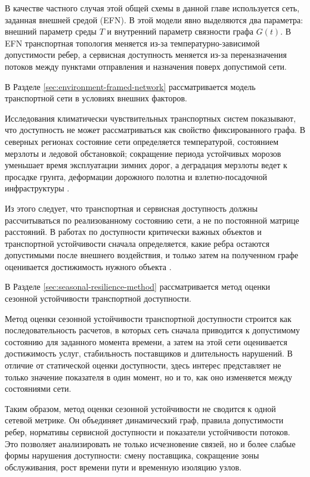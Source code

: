 В качестве частного случая этой общей схемы в данной главе используется сеть, заданная внешней средой (EFN). В этой модели явно выделяются два параметра: внешний параметр среды \(T\) и внутренний параметр связности графа \(G(t)\). В EFN транспортная топология меняется из-за температурно-зависимой допустимости ребер, а сервисная доступность меняется из-за переназначения потоков между пунктами отправления и назначения поверх допустимой сети.

В Разделе \ref{sec:environment-framed-network} рассматривается модель транспортной сети в условиях внешних факторов.

Исследования климатически чувствительных транспортных систем показывают, что доступность не может рассматриваться как свойство фиксированного графа. В северных регионах состояние сети определяется температурой, состоянием мерзлоты и ледовой обстановкой; сокращение периода устойчивых морозов уменьшает время эксплуатации зимних дорог, а деградация мерзлоты ведет к просадке грунта, деформации дорожного полотна и взлетно-посадочной инфраструктуры \cite{dong2025iceRoads,waite2023arcticTransport,stephenson2011arcticAccess,povoroznyuk2022arcticRoads}.

Из этого следует, что транспортная и сервисная доступность должны рассчитываться по реализованному состоянию сети, а не по постоянной матрице расстояний. В работах по доступности критически важных объектов и транспортной устойчивости сначала определяется, какие ребра остаются допустимыми после внешнего воздействия, и только затем на полученном графе оценивается достижимость нужного объекта \cite{gangwal2023criticalFacility,yin2023transportResilience}.

В Разделе \ref{sec:seasonal-resilience-method} рассматривается метод оценки сезонной устойчивости транспортной доступности.

Метод оценки сезонной устойчивости транспортной доступности строится как последовательность расчетов, в которых сеть сначала приводится к допустимому состоянию для заданного момента времени, а затем на этой сети оценивается достижимость услуг, стабильность поставщиков и длительность нарушений. В отличие от статической оценки доступности, здесь интерес представляет не только значение показателя в один момент, но и то, как оно изменяется между состояниями сети.

Таким образом, метод оценки сезонной устойчивости не сводится к одной сетевой метрике. Он объединяет динамический граф, правила допустимости ребер, нормативы сервисной доступности и показатели устойчивости потоков. Это позволяет анализировать не только исчезновение связей, но и более слабые формы нарушения доступности: смену поставщика, сокращение зоны обслуживания, рост времени пути и временную изоляцию узлов.


